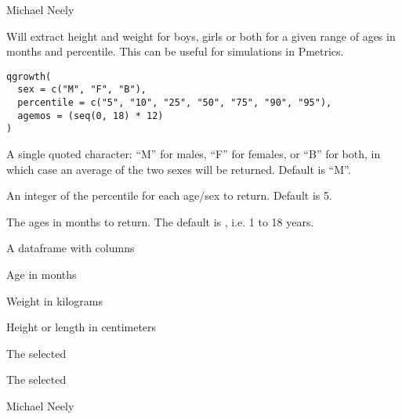 \documentclass[a4paper]{book}
\begin{document}
%
\begin{Author}\relax
Michael Neely
\end{Author}
%
\begin{SeeAlso}\relax
{}
\end{SeeAlso}
%
\begin{Description}\relax
Will extract height and weight for boys, girls or both for a given range of ages in months and percentile. This can be useful for 
simulations in Pmetrics.
\end{Description}
%
\begin{Usage}
\begin{verbatim}
qgrowth(
  sex = c("M", "F", "B"),
  percentile = c("5", "10", "25", "50", "75", "90", "95"),
  agemos = (seq(0, 18) * 12)
)
\end{verbatim}
\end{Usage}
%
\begin{Arguments}
\begin{ldescription}
\item[\code{sex}] A single quoted character: ``M'' for males, ``F'' for females, or ``B'' for both, in which case an average
of the two sexes will be returned.  Default is ``M''.

\item[\code{percentile}] An integer of the percentile for each age/sex to return.  Default is 5.

\item[\code{agemos}] The ages in months to return.  The default is , i.e. 1 to 18 years.
\end{ldescription}
\end{Arguments}
%
\begin{Value}
A dataframe with columns
\begin{ldescription}
\item[\code{age }] Age in months
\item[\code{wt }] Weight in kilograms
\item[\code{ht }] Height or length in centimeters
\item[\code{sex }] The selected 
\item[\code{percentile }] The selected 
\end{ldescription}
\end{Value}
%
\begin{Author}\relax
Michael Neely
\end{Author}
\end{document}
